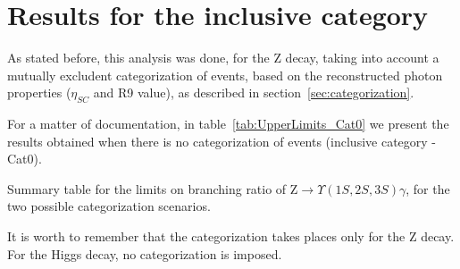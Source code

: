 \section{Results for the inclusive category}

As stated before, this analysis was done, for the Z decay, taking into account a mutually excludent categorization of events, based on the reconstructed photon properties ($\eta_{SC}$ and R9 value), as described in section~\ref{sec:categorization}. 

For a matter of documentation, in table~\ref{tab:UpperLimits_Cat0} we present the results obtained when there is no categorization of events (inclusive category - Cat0).

\begin{table}[ht]
\begin{center}
% 

\caption{Summary table for the limits on branching ratio of $\mathrm{Z}\to\Upsilon(1S,2S,3S)\gamma$, for the two possible categorization scenarios.}
\label{tab:UpperLimits_Cat0}
\end{center}
\end{table}


It is worth to remember that the categorization takes places only for the Z decay. For the Higgs decay, no categorization is imposed.


\clearpage
